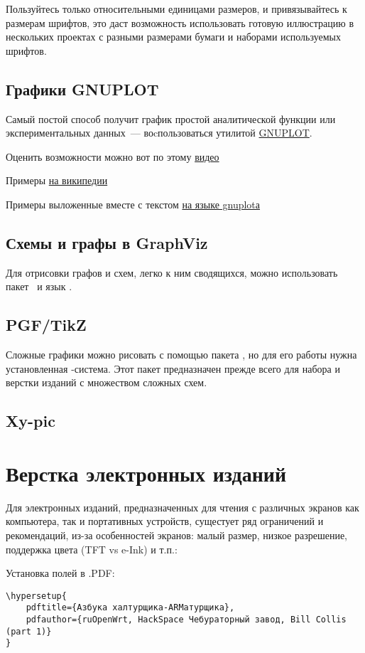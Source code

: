 Пользуйтесь только относительными единицами размеров, и привязывайтесь к
размерам шрифтов, это даст возможность использовать готовую иллюстрацию в
нескольких проектах с разными размерами бумаги и наборами используемых шрифтов.

\subsection{Графики GNUPLOT}

Самый постой способ получит график простой аналитической функции или
экспериментальных данных\ --- воcпользоваться утилитой
\href{http://gnuplot.info/}{GNUPLOT}.

\bigskip
Оценить возможности можно вот по этому
\href{http://upload.wikimedia.org/wikipedia/commons/b/b2/Gnuplot.ogv}{видео}

\bigskip
Примеры
\href{http://commons.wikimedia.org/wiki/Category:Gnuplot\_diagrams}{на
википедии}

\bigskip
Примеры выложенные вместе с текстом
\href{http://commons.wikimedia.org/wiki/Category:Images\_with\_Gnuplot\_source\_code}{на
языке gnuplotа}

\subsection{Схемы и графы в GraphViz}

Для отрисовки графов и схем, легко к ним сводящихся, можно использовать пакет
\ и язык . 

\subsection{PGF/TikZ}

Сложные графики можно рисовать с помощью пакета , но для его
работы нужна установленная \latex-система. Этот пакет предназначен прежде всего
для набора и верстки изданий с множеством сложных схем.



\subsection{Xy-pic}

\section{Верстка электронных изданий}

Для электронных изданий, предназначенных для чтения с различных экранов как
компьютера, так и портативных устройств, сущестует ряд ограничений и
рекомендаций, из-за особенностей экранов: малый размер, низкое разрешение,
поддержка цвета (TFT vs e-Ink) и т.п.: \cite{ebooktex}

\bigskip
Установка полей в .PDF:

\nopagebreak
\begin{verbatim}
\hypersetup{
	pdftitle={Азбука халтурщика-ARMатурщика},
	pdfauthor={ruOpenWrt, HackSpace Чебураторный завод, Bill Collis (part 1)}
}
\end{verbatim}
